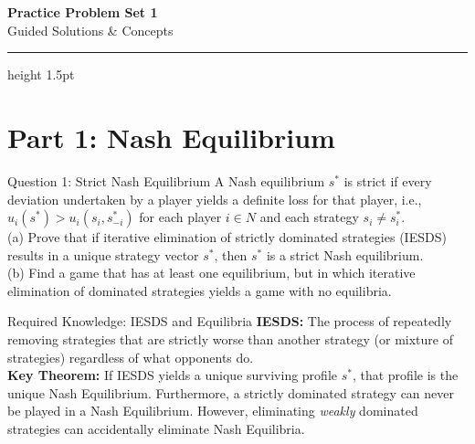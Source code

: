 \documentclass[12pt, a4paper]{article}
\begin{document}
\begin{center}
  {\LARGE\bfseries\sffamily\color{defblue} Practice Problem Set 1}\\[6pt]
  {\Large\sffamily Guided Solutions \& Concepts}\\[4pt]
\end{center}
\vspace{0.3cm}
\hrule height 1.5pt
\vspace{0.6cm}

\section*{Part 1: Nash Equilibrium}

\begin{exbox}{Question 1: Strict Nash Equilibrium}
A Nash equilibrium $s^*$ is strict if every deviation undertaken by a player yields a definite loss for that player, i.e., $u_i(s^*) > u_i(s_i, s^*_{-i})$ for each player $i \in N$ and each strategy $s_i \neq s_i^*$. \\
(a) Prove that if iterative elimination of strictly dominated strategies (IESDS) results in a unique strategy vector $s^*$, then $s^*$ is a strict Nash equilibrium. \\
(b) Find a game that has at least one equilibrium, but in which iterative elimination of dominated strategies yields a game with no equilibria.
\end{exbox}

\begin{defbox}{Required Knowledge: IESDS and Equilibria}
\textbf{IESDS:} The process of repeatedly removing strategies that are strictly worse than another strategy (or mixture of strategies) regardless of what opponents do. \\
\textbf{Key Theorem:} If IESDS yields a unique surviving profile $s^*$, that profile is the unique Nash Equilibrium. Furthermore, a strictly dominated strategy can never be played in a Nash Equilibrium. However, eliminating \textit{weakly} dominated strategies can accidentally eliminate Nash Equilibria.
\end{defbox}
\end{document}
